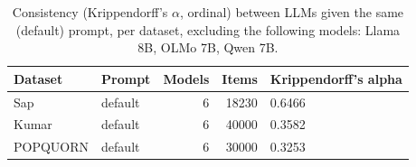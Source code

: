 \begin{table}[t]
\centering
\caption{Consistency (Krippendorff's $\alpha$, ordinal) between LLMs given the same (default) prompt, per dataset, excluding the following models: Llama 8B, OLMo 7B, Qwen 7B.}
\label{tab:llm-consistency-cross-model-excluding}
\begin{tabular}{llrrl}
\toprule
Dataset & Prompt & Models & Items & Krippendorff's alpha \\
\midrule
Sap & default & 6 & 18230 & 0.6466 \\
Kumar & default & 6 & 40000 & 0.3582 \\
POPQUORN & default & 6 & 30000 & 0.3253 \\
\bottomrule
\end{tabular}
\end{table}
